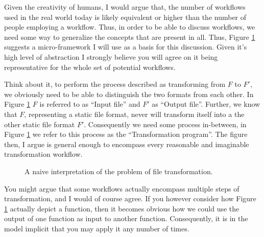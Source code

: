 \documentclass{scrreprt}
\begin{document}
Given the creativity of humans, I would argue that, the number of workflows used in the real world today is likely equivalent or higher than the number of people employing a workflow. Thus, in order to be able to discuss workflows, we need some way to generalize the concepts that are present in all. Thus, Figure \ref{fig:workflows-framework} suggests a micro-framework I will use as a basis for this discussion. Given it's high level of abstraction I strongly believe you will agree on it being representative for the whole set of potential workflows.

Think about it, to perform the process described as transforming from \(F\) to \(F\prime\), we obviously need to be able to distinguish the two formats from each other. In Figure \ref{fig:workflows-framework} \(F\) is referred to as ``Input file'' and \(F\prime\) as ``Output file''. Further, we know that \(F\), representing a static file format, never will transform itself into a the other static file format \(F\prime\). Consequently we need some process in-between, in Figure \ref{fig:workflows-framework} we refer to this process as the ``Transformation program''. The figure then, I argue is general enough to encompass every reasonable and imaginable transformation workflow.


\begin{figure}[h]
  \centering


  \caption{A naive interpretation of the problem of file transformation.}
  \label{fig:workflows-framework}
\end{figure}


You might argue that some workflows actually encompass multiple steps of transformation, and I would of course agree. If you however consider how Figure \ref{fig:workflows-framework} actually depict a function, then it becomes obvious how we could use the output of one function as input to another function. Consequently, it is in the model implicit that you may apply it any number of times.
\end{document}
